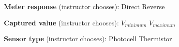 \vskip 10pt

\noindent
{\bf Meter response} (instructor chooses): \hskip 20pt \underbar{\hskip 20pt} Direct \hskip 20pt \underbar{\hskip 20pt} Reverse

\vskip 10pt

\noindent
{\bf Captured value} (instructor chooses): \hskip 20pt \underbar{\hskip 20pt} $V_{minimum}$ \hskip 20pt \underbar{\hskip 20pt} $V_{maximum}$

\vskip 10pt

\noindent
{\bf Sensor type} (instructor chooses): \hskip 20pt \underbar{\hskip 20pt} Photocell \hskip 20pt \underbar{\hskip 20pt} Thermistor

\vfil



















